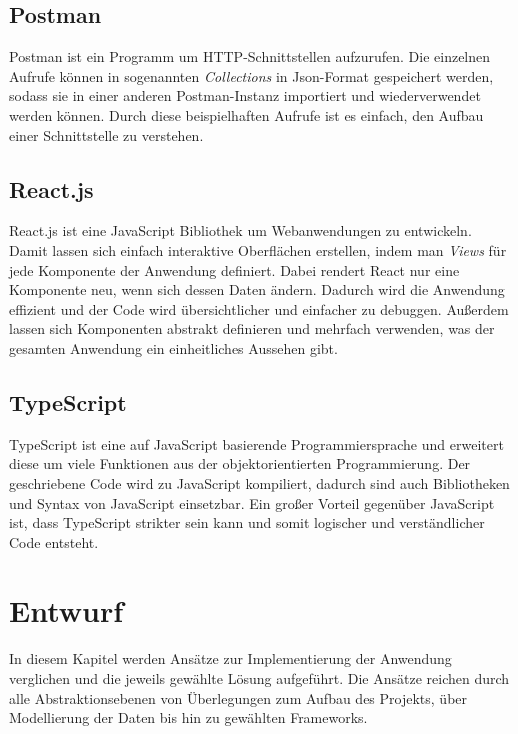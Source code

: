 \documentclass[12pt,twoside,a4paper]{article}
\begin{document}
\subsection{Postman}\label{sec:postman}
Postman ist ein Programm um HTTP-Schnittstellen aufzurufen. Die einzelnen Aufrufe können in sogenannten \textit{Collections} in Json-Format gespeichert werden, sodass sie in einer anderen Postman-Instanz importiert und wiederverwendet werden können. Durch diese beispielhaften Aufrufe ist es einfach, den Aufbau einer Schnittstelle zu verstehen.
\subsection{React.js}\label{sec:react}
React.js ist eine JavaScript Bibliothek um Webanwendungen zu entwickeln. Damit lassen sich einfach interaktive Oberflächen erstellen, indem man \textit{Views} für jede Komponente der Anwendung definiert. Dabei rendert React nur eine Komponente neu, wenn sich dessen Daten ändern. Dadurch wird die Anwendung effizient und der Code wird übersichtlicher und einfacher zu debuggen. Außerdem lassen sich Komponenten abstrakt definieren und mehrfach verwenden, was der gesamten Anwendung ein einheitliches Aussehen gibt. \cite{react}
\subsection{TypeScript}\label{sec:typescript}
TypeScript ist eine auf JavaScript basierende Programmiersprache und erweitert diese um viele Funktionen aus der objektorientierten Programmierung. Der geschriebene Code wird zu JavaScript kompiliert, dadurch sind auch Bibliotheken und Syntax von JavaScript einsetzbar. Ein großer Vorteil gegenüber JavaScript ist, dass TypeScript strikter sein kann und somit logischer und verständlicher Code entsteht. \cite{ts-vs-js}
\newpage
\section{Entwurf}
In diesem Kapitel werden Ansätze zur Implementierung der Anwendung verglichen und die jeweils gewählte Lösung aufgeführt. Die Ansätze reichen durch alle Abstraktionsebenen von Überlegungen zum Aufbau des Projekts, über Modellierung der Daten bis hin zu gewählten Frameworks.
\end{document}
